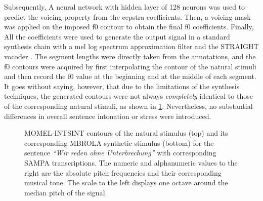 Subsequently, A neural network with hidden layer of 128 neurons was used to predict the voicing property from the cepstra coefficients.
Then, a voicing mask was applied on the imposed \ac{f0} contour to obtain the final \ac{f0} coefficients.
Finally, All the coefficients were used to generate the output signal in a standard synthesis chain with a mel log spectrum approximation filter and the STRAIGHT vocoder \citep{Kawahara2006straight}.
The segment lengths were directly taken from the annotations, and the \ac{f0} contours were acquired by first interpolating the contour of the natural stimuli and then record the \ac{f0} value at the beginning and at the middle of each segment.
It goes without saying, however, that due to the limitations of the synthesis techniques, the generated contours were not always \emph{completely} identical to those of the corresponding natural stimuli, as shown in \cref{fig:momel-comparison}.
Nevertheless, no substantial differences in overall sentence intonation or stress were introduced.
%
\begin{figure}[t]
	\centering
	\caption[MOMEL comparison of natural \acs{f0} contour imposition on a synthetic stimulus]
		{MOMEL-INTSINT contours of the natural stimulus (top) and its corresponding MBROLA synthetic stimulus (bottom) for the sentence \emph{\enquote{Wir reden ohne Unterbrechung}} with corresponding SAMPA transcriptions.
		The numeric and alphanumeric values to the right are the absolute pitch frequencies and their corresponding musical tone.
		The scale to the left displays one octave around the median pitch of the signal.}
	\label{fig:momel-comparison}
\end{figure}

